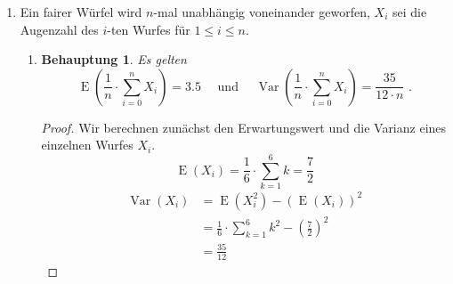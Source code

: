 \documentclass[a4paper]{scrartcl}
\newtheorem*{behaupt}{Behauptung}
\newcommand{\e}{\operatorname{E}}
\newcommand{\var}{\operatorname{Var}}
\begin{document}
\begin{enumerate}[label=\bfseries\arabic*.]
    \item
        Ein fairer Würfel wird $n$-mal unabhängig voneinander geworfen, $X_i$
        sei die Augenzahl des $i$-ten Wurfes für $1 \leq i \leq n$.
        \begin{enumerate}[label=(\alph*)]
            \item
                \begin{behaupt}
                    Es gelten
                    \begin{equation*}
                        \e \left( \frac{1}{n} \cdot \sum_{i=0}^n X_i \right)
                        = \num{3,5}
                        \quad \text{ und } \quad
                        \var \left( \frac{1}{n} \cdot \sum_{i=0}^n X_i \right)
                        = \frac{35}{12 \cdot n}
                        \text{ .}
                    \end{equation*}
                \end{behaupt}
                \begin{proof}
                    Wir berechnen zunächst den Erwartungswert und die Varianz
                    eines einzelnen Wurfes $X_i$.
                    \begin{equation*}
                        \e(X_i) = \frac{1}{6} \cdot \sum_{k=1}^6 k = \frac{7}{2}
                    \end{equation*}
                    \begin{equation*}
                        \begin{split}
                            \var(X_i) 
                            &= \e(X_i^2) - (\e(X_i))^2 \\
                            &= \frac{1}{6} \cdot \sum_{k=1}^6 k^2
                                - \left( \frac{7}{2} \right)^2 \\
                            &= \frac{35}{12}
                        \end{split}
                    \end{equation*}


\end{proof}
\end{enumerate}
\end{enumerate}
\end{document}

